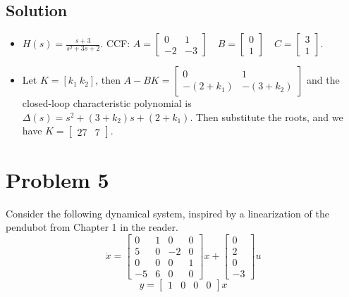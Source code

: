 \documentclass[11pt]{report}
\begin{document}

\subsection*{Solution}
\begin{itemize}
\item $H(s) = \frac{s+3}{s^2+3s+2}$. CCF: $A = \begin{bmatrix} 0 & 1 \\-2 & -3 \end{bmatrix} \quad B = \begin{bmatrix} 0 \\ 1 \end{bmatrix} \quad C = \begin{bmatrix} 3 \\ 1 \end{bmatrix}$.
\item Let $K = [k_1 ~ k_2]$, then $A - B K = \begin{bmatrix} 0 & 1 \\-(2 + k_1) & -(3 + k_2) \end{bmatrix}$ and the closed-loop characteristic polynomial is $\Delta(s) = s^2 + (3 + k_2)s + (2 + k_1)$. Then substitute the roots, and we have $K = \begin{bmatrix}27 & 7\end{bmatrix}$.
\end{itemize}


\pagebreak
\section*{Problem 5}

Consider the following dynamical system, inspired by a linearization of the pendubot from Chapter 1 in the reader.
\[
\dot x =
\begin{bmatrix}
0 & 1 & 0 & 0 \\
5 & 0 & -2 & 0 \\
0 & 0 & 0 & 1 \\
-5 & 6 & 0 & 0
\end{bmatrix}
x +
\begin{bmatrix}
0 \\
2 \\
0 \\
-3
\end{bmatrix}
u
\]
\[
y =
\begin{bmatrix}
1 & 0 & 0 & 0
\end{bmatrix}
x
\]
\end{document}
